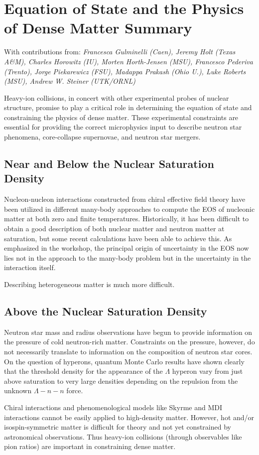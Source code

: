 \documentclass{revtex4}
\begin{document}
\section*{Equation of State and the Physics of Dense Matter Summary}
\begin{center}
  With contributions from: {\it{Francesca Gulminelli (Caen),
      Jeremy Holt (Texas A\&M),
      Charles Horowitz (IU), Morten Horth-Jensen (MSU),
      Francesco Pederiva (Trento), Jorge Piekarewicz (FSU),
      Madappa Prakash (Ohio U.), Luke Roberts (MSU),
      Andrew W. Steiner (UTK/ORNL)}}
\end{center}

Heavy-ion collisions, in concert with other experimental probes of
nuclear structure, promise to play a critical role in determining
the equation of state and constraining the physics of dense matter.
These experimental constraints are essential for providing the correct
microphysics input to describe neutron star phenomena, core-collapse
supernovae, and neutron star mergers.

\subsection{Near and Below the Nuclear Saturation Density}

Nucleon-nucleon interactions constructed from chiral effective field
theory have been utilized in different many-body approaches to compute
the EOS of nucleonic matter at both zero and finite temperatures.
Historically, it has been difficult to obtain a good description of
both nuclear matter and neutron matter at saturation, but some
recent calculations have been able to achieve this. As emphasized
in the workshop, the principal origin of uncertainty in the EOS now
lies not in the approach to the many-body problem but in the
uncertainty in the interaction itself. 

Describing heterogeneous matter is much more difficult.

\subsection{Above the Nuclear Saturation Density}

Neutron star mass and radius observations have begun to provide
information on the pressure of cold neutron-rich matter. Constraints
on the pressure, however, do not necessarily translate to information
on the composition of neutron star cores. On the question of hyperons,
quantum Monte Carlo results have shown clearly that the threshold
density for the appearance of the $\Lambda$ hyperon vary from just
above saturation to very large densities depending on the repulsion
from the unknown $\Lambda-n-n$ force.

Chiral interactions and phenomenological models like Skyrme and MDI
interactions cannot be easily applied to high-density matter. However,
hot and/or isospin-symmetric matter is difficult for theory and not
yet constrained by astronomical observations. Thus heavy-ion
collisions (through observables like pion ratios) are important in
constraining dense matter.
\end{document}
